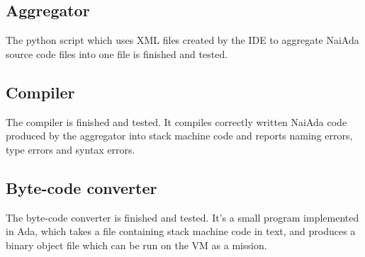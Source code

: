 \subsection{Aggregator}
The python script which uses XML files created by the IDE to aggregate NaiAda source code files into one file is finished and tested.

\subsection{Compiler}
The compiler is finished and tested. It compiles correctly written NaiAda code produced by the aggregator into stack machine code and reports naming errors, type errors and syntax errors.

\subsection{Byte-code converter}
The byte-code converter is finished and tested. It's a small program implemented in Ada, which takes a file containing stack machine code in text, and produces a binary object file which can be run on the VM as a mission.